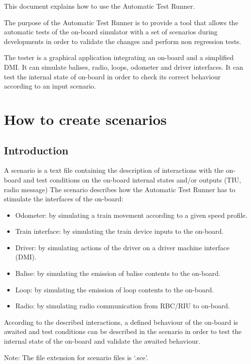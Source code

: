 \documentclass{template/openetcs}
\begin{document}
This document explains how to use the Automatic Test Runner.

The purpose of the Automatic Test Runner is to provide a tool that allows the automatic tests of the on-board simulator with a set of scenarios during developments in order to validate the changes and perform non regression tests.

The tester is a graphical application integrating an on-board and a simplified DMI. It can simulate balises, radio, loops, odometer and driver interfaces. It can test the internal state of on-board in order to check its correct behaviour according to an input scenario.

\section{How to create scenarios}
\subsection{Introduction}

A scenario is a text file containing the description of interactions with the on-board and test conditions on the on-board internal states and/or outputs (TIU, radio message)
The scenario describes how the Automatic Test Runner has to stimulate the interfaces of the on-board:

\begin{itemize}
	\item Odometer: by simulating a train movement according to a given speed profile.
	\item Train interface: by simulating the train device inputs to the on-board.
	\item Driver: by simulating actions of the driver on a driver machine interface (DMI).
	\item Balise: by simulating the emission of balise contents to the on-board.
	\item Loop: by simulating the emission of loop contents to the on-board.
	\item Radio: by simulating radio communication from RBC/RIU to on-board.
\end{itemize}

According to the described interactions, a defined behaviour of the on-board is awaited and test conditions can be described in the scenario in order to test the internal state of the on-board and validate the awaited behaviour. 

Note: The file extension for scenario files is ‘.sce’.
\end{document}
